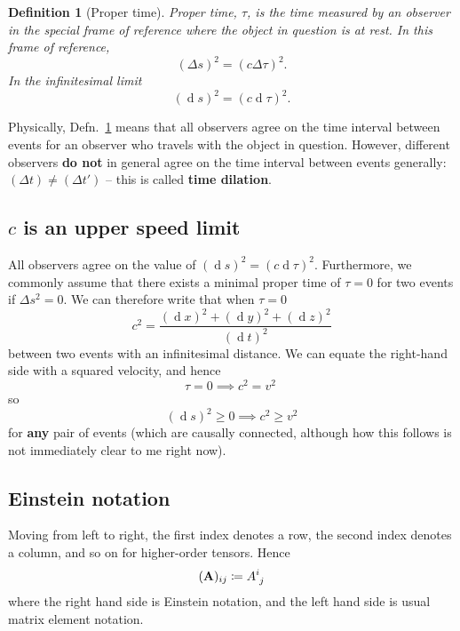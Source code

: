 \documentclass[11pt]{article}
\numberwithin{equation}{section}
\newcommand{\defeq}{\coloneqq}
\renewcommand{\d}[1]{\ensuremath{\operatorname{d}\!{#1}}}
\newtheorem{defn}{Definition}[section]
\begin{document}
\begin{defn}[Proper time] \label{defn:proper-time}
Proper time, $\tau$, is the time measured by an observer in the special frame of reference where the object in question is at rest. In this frame of reference,
\begin{equation}
(\Delta s)^2 = (c \Delta \tau)^2.
\end{equation}
In the infinitesimal limit
\begin{equation}
(\d s)^2 = (c \d \tau)^2.
\end{equation}
\end{defn}
Physically, Defn.~\ref{defn:proper-time} means that all observers agree on the time interval between events for an observer who travels with the object in question. However, different observers \textbf{do not} in general agree on the time interval between events generally: $(\Delta t) \neq (\Delta t')$ -- this is called \textbf{time dilation}. 

\subsection{$c$ is an upper speed limit}
All observers agree on the value of $(\d s)^2=(c \d \tau)^2$. Furthermore, we commonly assume that there exists a minimal proper time of $\tau = 0$ for two events if $\Delta s^2 = 0$. We can therefore write that when $\tau = 0$
\begin{equation}
c^2 = \frac{(\d x)^2 + (\d y)^2 + (\d z)^2}{(\d t)^2}
\end{equation}
between two events with an infinitesimal distance. We can equate the right-hand side with a squared velocity, and hence
\begin{equation}
\tau = 0 \implies c^2 = v^2\ 
\end{equation}
so
\begin{equation}
(\d s)^2 \geq 0 \implies c^2 \geq v^2
\end{equation}
for \textbf{any} pair of events (which are causally connected, although how this follows is not immediately clear to me right now). 

\subsection{Einstein notation}
Moving from left to right, the first index denotes a row, the second index denotes a column, and so on for higher-order tensors. Hence
\begin{equation}
(\textbf{A})_{ij} \defeq \tensor{A}{^i_j}
\end{equation}
where the right hand side is Einstein notation, and the left hand side is usual matrix element notation. 
\end{document}
